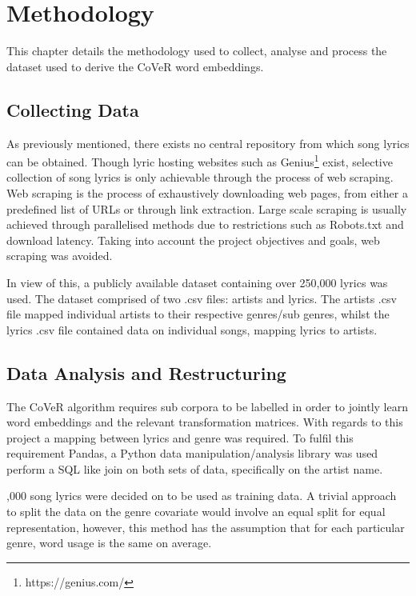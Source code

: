\chapter{Methodology}
This chapter details the methodology used to collect, analyse and process the dataset used to derive the CoVeR word embeddings.
\label{chap:data_methodology}
\section{Collecting Data}
As previously mentioned, there exists no central repository from which song lyrics can be obtained. Though lyric hosting websites such as Genius\footnote{https://genius.com/} exist, selective collection of song lyrics is only achievable through the process of web scraping. Web scraping is the process of exhaustively downloading web pages, from either a predefined list of URLs or through link extraction. Large scale scraping is usually achieved through parallelised methods due to restrictions such as Robots.txt and download latency. Taking into account the project objectives and goals, web scraping was avoided.

\noindent
\newline
In view of this, a publicly available dataset containing over 250,000 lyrics was used. The dataset comprised of two .csv files: artists and lyrics. The artists .csv file mapped individual artists to their respective genres/sub genres, whilst the lyrics .csv file contained data on individual songs, mapping lyrics to artists. 
\section{Data Analysis and Restructuring}
The CoVeR algorithm requires sub corpora to be labelled in order to jointly learn word embeddings and the relevant transformation matrices. With regards to this project a mapping between lyrics and genre was required. To fulfil this requirement Pandas, a Python data manipulation/analysis library was used  perform a SQL like join on both sets of data, specifically on the artist name.

\noindent
{},000 song lyrics were decided on to be used as training data. A trivial approach to split the data on the genre covariate would involve an equal split for equal representation, however, this method has the assumption that for each particular genre, word usage is the same on average. 

